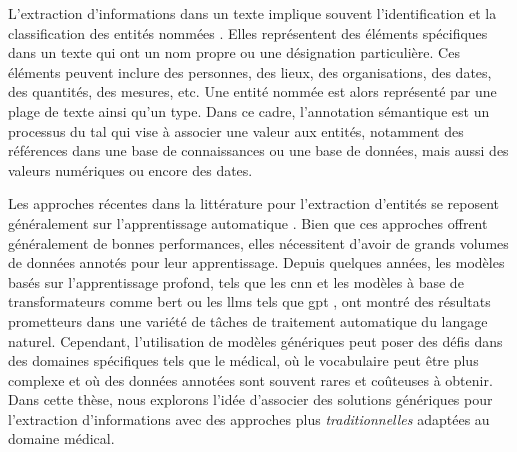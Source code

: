 L'extraction d'informations dans un texte implique souvent l'identification et la classification des entités nommées \cite{alshaikhdeebBiomedicalNamedEntity2016,goyalRecentNamedEntity2018,nasarNamedEntityRecognition2021}.
Elles représentent des éléments spécifiques dans un texte qui ont un nom propre ou une désignation particulière.
Ces éléments peuvent inclure des personnes, des lieux, des organisations, des dates, des quantités, des mesures, etc.
Une entité nommée est alors représenté par une plage de texte ainsi qu'un type.
Dans ce cadre, l'annotation sémantique est un processus du \gls{tal} qui vise à associer une valeur aux entités, notamment des références dans une base de connaissances ou une base de données, mais aussi des valeurs numériques ou encore des dates.

Les approches récentes dans la littérature pour l'extraction d'entités se reposent généralement sur l'apprentissage automatique \cite{nasarNamedEntityRecognition2021}.
Bien que ces approches offrent généralement de bonnes performances, elles nécessitent d'avoir de grands volumes de données annotés pour leur apprentissage.
Depuis quelques années, les modèles basés sur l'apprentissage profond, tels que les \gls{cnn} et les modèles à base de transformateurs comme \gls{bert} \cite{devlinBERTPretrainingDeep2019} ou les \glspl{llm} tels que \gls{gpt} \cite{radfordImprovingLanguageUnderstanding2018, brownLanguageModelsAre2020}, ont montré des résultats prometteurs dans une variété de tâches de traitement automatique du langage naturel.
Cependant, l'utilisation de modèles génériques peut poser des défis dans des domaines spécifiques tels que le médical, où le vocabulaire peut être plus complexe et où des données annotées sont souvent rares et coûteuses à obtenir.
Dans cette thèse, nous explorons l'idée d'associer des solutions génériques pour l'extraction d'informations avec des approches plus \emph{traditionnelles} adaptées au domaine médical.

